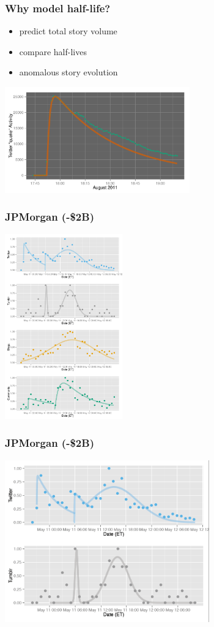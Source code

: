 \documentclass{beamer}
\begin{document}
\begin{frame}\frametitle{Why model half-life?}
{\Large
\begin{itemize}
\item predict total story volume
\item compare half-lives
\item anomalous story evolution
\end{itemize}
}
\end{frame}

\begin{frame}
  \begin{center}
    \includegraphics[width=8cm]{./imgs/SMP_va_quake_fit1.pdf}
  \end{center}
\end{frame}


\begin{frame}\frametitle{JPMorgan (-\$2B)}
 \hfill \includegraphics[height=8.0cm]{./imgs/SMP_JPMorgan.pdf}
\end{frame}

\begin{frame}\frametitle{JPMorgan (-\$2B)}
 \hfill \includegraphics[height=7.0cm]{./imgs/SMP_JPMorgan_top.png}
\end{frame}
\end{document}
